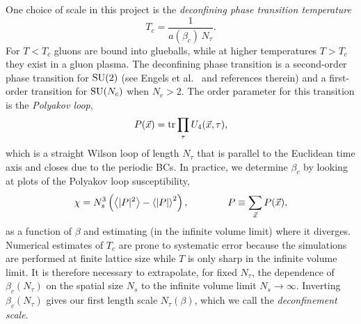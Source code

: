 One choice of scale in this project is the {\it deconfining phase 
transition temperature}
\begin{equation}
  T_c=\frac{1}{a(\beta_c)\,N_\tau}.
\end{equation}
For $T<T_c$ gluons are bound into  glueballs, while 
at higher temperatures $T>T_c$ they exist in a gluon plasma. 
The deconfining phase transition is a second-order phase transition for 
$\operatorname{SU}(2)$ (see Engels et al.~\cite{engels_critical_1996} and
references therein) and a first-order transition for $\operatorname{SU}(N_c)$ when $N_c>2$. 
The order parameter for this transition is the 
{\it Polyakov loop}, 
\begin{equation}
  P(\vec{x})=\tr\prod_\tau U_4(\vec{x},\tau),
\end{equation}
which is a straight 
Wilson loop of length $N_\tau$ that is parallel to the Euclidean time 
axis and closes due to the periodic BCs. In practice, 
we determine $\beta_c$ by looking at plots of the Polyakov loop 
susceptibility,
\begin{equation}
  \chi=N_s^3\left(\ev{|P|^2}-\ev{|P|}^2\right), \qquad\qquad 
    P\equiv\sum\limits_{\vec{x}}P(\vec{x}),
\end{equation}
as a function of $\beta$ and estimating (in the infinite volume limit)
where it diverges. Numerical estimates
of $T_c$ are prone to systematic error because the simulations are
performed at finite lattice size while $T$ is only sharp in the infinite
volume limit. It is therefore necessary to extrapolate, for fixed $N_{\tau}$,
the dependence of $\beta_c(N_\tau)$ on the spatial size $N_s$ to the
infinite volume limit $N_s\to\infty$. Inverting $\beta_c(N_\tau)$ gives
our first length scale $N_\tau(\beta)$, which we call the
{\it deconfinement scale}.

